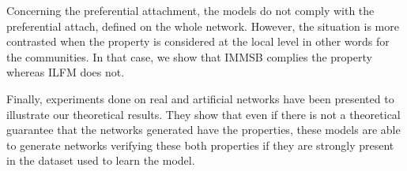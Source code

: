 \documentclass[9pt,twocolumn,twoside]{pnas-new}
\begin{document}
Concerning the preferential attachment, the models do not comply with the preferential attach, defined on the whole network. However, the situation is more contrasted when the property is considered at the local level in other words for the communities. In that case, we show that IMMSB complies the property whereas ILFM does not.

Finally, experiments done on real and artificial networks have been presented to illustrate our theoretical results. They show that even if there is not a theoretical guarantee that the networks generated  have the  properties, these models are able to generate networks verifying these both properties if they are  strongly present in the dataset used to learn the model.


%

\end{document}
